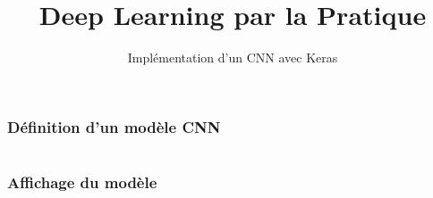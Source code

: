 \documentclass{formation}
\title{Deep Learning par la Pratique}
\subtitle{Implémentation d'un CNN avec Keras}
\begin{document}
\maketitle

\begin{frame}
  \frametitle{Définition d'un modèle CNN}
  \inputminted[linenos,fontsize=\small,bgcolor=pythonbg]{python}{code-illustration/tf-keras-cnn.py}
\end{frame}

\begin{frame}
  \frametitle{Affichage du modèle}
  \inputminted[linenos,fontsize=\small,bgcolor=pythonbg]{python}{code-illustration/tf-keras-print-model.py}
  \inputminted[linenos,fontsize=\small,bgcolor=returnbg]{python}{code-illustration/tf-keras-print-cnn-model.txt}
\end{frame}
\end{document}
